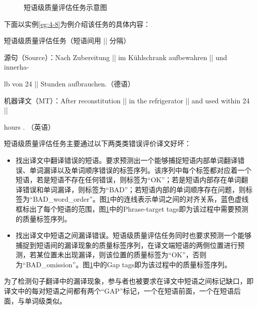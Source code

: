 \begin{figure}[htp]
    \centering
	
   \caption{短语级质量评估任务示意图}
   \label{fig:4-12}
\end{figure}

\parinterval 下面以实例\ref{eg:4-8}为例介绍该任务的具体内容：

\begin{example}
短语级质量评估任务（短语间用 || 分隔）

源句（Source）：Nach Zubereitung || im Kühlschrank aufbewahren || und innerha-

\hspace{7.3em}lb von 24 || Stunden aufbrauchen.（德语）

机器译文（MT）：After reconstitution || in the refrigerator || and used within 24 ||

 \hspace{8em}hours . （英语）
\label{eg:4-8}
\end{example}

\parinterval 短语级质量评估任务主要通过以下两类类错误评价译文好坏：

\begin{itemize}
\vspace{0.5em}
\item 找出译文中翻译错误的短语。要求预测出一个能够捕捉短语内部单词翻译错误、单词漏译以及单词顺序错误的标签序列。该序列中每个标签都对应着一个短语，若是短语不存在任何错误，则标签为“OK”；若是短语内部存在单词翻译错误和单词漏译，则标签为“BAD”；若短语内部的单词顺序存在问题，则标签为“BAD\_word\_order”。图\ref{fig:4-12}中的连线表示单词之间的对齐关系，蓝色虚线框标出了每个短语的范围，图\ref{fig:4-12}中的Phrase-target tags即为该过程中需要预测的质量标签序列。
\vspace{0.5em}
\item 找出译文中短语之间漏译错误。短语级质量评估任务同时也要求预测一个能够捕捉到短语间的漏译现象的质量标签序列，在译文端短语的两侧位置进行预测，若某位置未出现漏译，则该位置的质量标签为“OK”，否则为“BAD\_omission”。图\ref{fig:4-12}中的Gap tags即为该过程中的质量标签序列。
\vspace{0.5em}
\end{itemize}

\parinterval 为了检测句子翻译中的漏译现象，参与者也被要求在译文中短语之间标记缺口，即译文中的每对短语之间都有两个“GAP”标记，一个在短语前面，一个在短语后面，与单词级类似。

